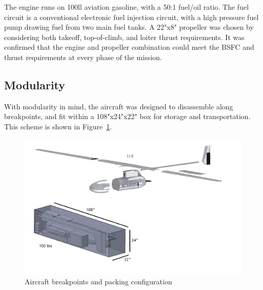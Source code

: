 \documentclass[journal]{aiaa-tc}%
\begin{document}
The engine runs on 100ll aviation gasoline, with a 50:1 fuel/oil ratio.  The fuel circuit is a conventional electronic fuel injection circuit, with a high pressure fuel pump drawing fuel from two main fuel tanks. A 22"x8" propeller was chosen by considering both takeoff, top-of-climb, and loiter thrust requirements. It was confirmed that the engine and propeller combination could meet the BSFC and thrust requirements at every phase of the mission. 
    
\subsection{Modularity}
\label{a:modularity}

With modularity in mind, the aircraft was designed to disassemble along breakpoints, and fit within a 108"x24"x22" box for storage and transportation. This scheme is shown in Figure~\ref{f:modularity}.

\begin{figure}[h!]
\centering
\includegraphics[width=.5\linewidth]{modularity.png}
\caption{Aircraft breakpoints and packing configuration}
\label{f:modularity}
\end{figure}
    



\end{document}
